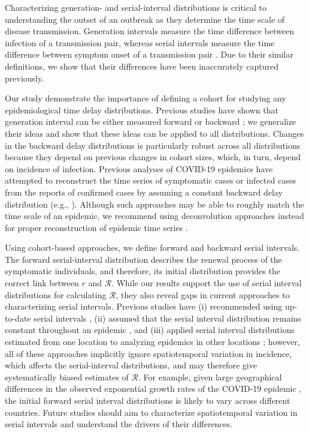 \documentclass[12pt]{article}
\newcommand{\RR}{\ensuremath{{\mathcal R}}\xspace}
\begin{document}
Characterizing generation- and serial-interval distributions is critical to understanding the outset of an outbreak as they determine the time scale of disease transmission.
Generation intervals measure the time difference between infection of a transmission pair, whereas serial intervals measure the time difference between symptom onset of a transmission pair \citep{svensson2007note}.
Due to their similar definitions, we show that their differences have been inaccurately captured previously.

Our study demonstrate the importance of defining a cohort for studying any epidemiological time delay distributions.
Previous studies have shown that generation interval can be either measured forward or backward \citep{champredon2015intrinsic};
we generalize their ideas and show that these ideas can be applied to all distributions.
Changes in the backward delay distributions is particularly robust across all distributions because they depend on previous changes in cohort sizes, which, in turn, depend on incidence of infection.
Previous analyses of COVID-19 epidemics have attempted to reconstruct the time series of symptomatic cases or infected cases from the reports of confirmed cases by assuming a constant backward delay distribution (e.g., \cite{tempvar, park2020potential, shim2020transmission}).
Although such approaches may be able to roughly match the time scale of an epidemic, we recommend using deconvolution approaches instead for proper reconstruction of epidemic time series \citep{goldstein2009reconstructing}.

Using cohort-based approaches, we define forward and backward serial intervals.
The forward serial-interval distribution describes the renewal process of the symptomatic individuals, and therefore, its initial distribution  provides the correct link between $r$ and \RR.
While our results support the use of serial interval distributions for calculating \RR, 
they also reveal gaps in current approaches to characterizing serial intervals.
Previous studies have (i) recommended using up-to-date serial intervals \citep{thompson2019improved}, (ii) assumed that the serial interval distribution remains constant throughout an epidemic \citep{wallinga2004different, cori2013new}, and (iii) applied serial interval distributions estimated from one location to analyzing epidemics in other locations \citep{tempvar};
however, all of these approaches implicitly ignore spatiotemporal variation in incidence, which affects the serial-interval distributions, and may therefore give systematically biased estimates of \RR. 
For example, given large geographical differences in the observed exponential growth rates of the COVID-19 epidemic \citep{tempvar}, the initial forward serial interval distributions is likely to vary across different countries.
Future studies should aim to characterize spatiotemporal variation in serial intervals and understand the drivers of their differences.
\end{document}
